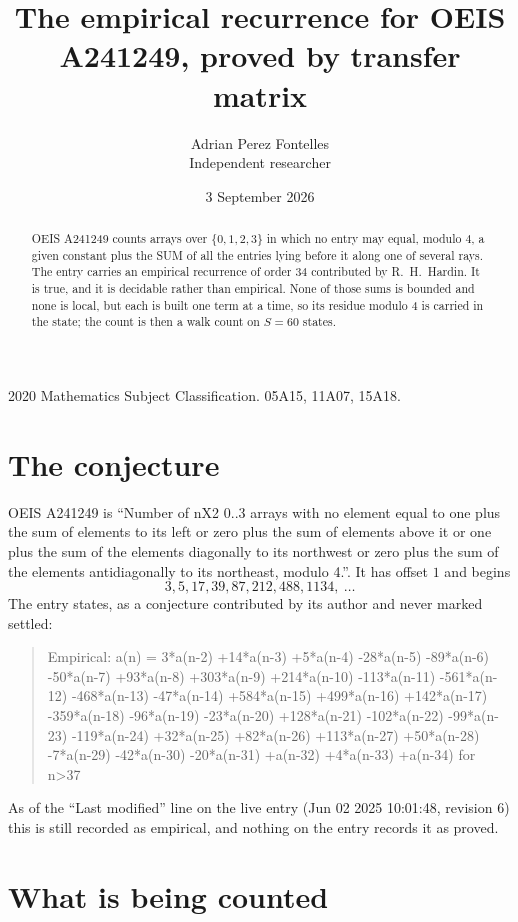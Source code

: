 \documentclass[11pt,a4paper]{article}
\title{The empirical recurrence for OEIS A241249, proved by transfer matrix}
\author{Adrian Perez Fontelles\\ \small Independent researcher}
\date{3 September 2026}
\theoremstyle{plain}
\theoremstyle{definition}
\begin{document}
\maketitle

\begin{abstract}
OEIS A241249 counts arrays over $\{0,1,2,3\}$ in which no entry may equal, modulo $4$, a given
constant plus the SUM of all the entries lying before it along one of several rays. The entry
carries an empirical recurrence of order $34$ contributed by R.~H.~Hardin. It is true, and
it is decidable rather than empirical. None of those sums is bounded and none is local, but
each is built one term at a time, so its residue modulo $4$ is carried in the state; the
count is then a walk count on $S=60$ states.
\end{abstract}

\noindent\small 2020 Mathematics Subject Classification. 05A15, 11A07, 15A18.\normalsize

\section{The conjecture}

OEIS A241249 is ``Number of nX2 0..3 arrays with no element equal to one plus the sum of elements to its left or zero plus the sum of elements above it or one plus the sum of the elements diagonally to its northwest or zero plus the sum of the elements antidiagonally to its northeast, modulo 4.''. It has offset $1$ and begins
\[
3, 5, 17, 39, 87, 212, 488, 1134,\ \dots
\]
The entry states, as a conjecture contributed by its author and never marked settled:
\begin{quote}
Empirical: a(n) = 3*a(n-2) +14*a(n-3) +5*a(n-4) -28*a(n-5) -89*a(n-6) -50*a(n-7) +93*a(n-8) +303*a(n-9) +214*a(n-10) -113*a(n-11) -561*a(n-12) -468*a(n-13) -47*a(n-14) +584*a(n-15) +499*a(n-16) +142*a(n-17) -359*a(n-18) -96*a(n-19) -23*a(n-20) +128*a(n-21) -102*a(n-22) -99*a(n-23) -119*a(n-24) +32*a(n-25) +82*a(n-26) +113*a(n-27) +50*a(n-28) -7*a(n-29) -42*a(n-30) -20*a(n-31) +a(n-32) +4*a(n-33) +a(n-34) for n>37
\end{quote}
As of the ``Last modified'' line on the live entry (Jun 02 2025 10:01:48, revision 6) this is still
recorded as empirical, and nothing on the entry records it as proved.

\section{What is being counted}
\end{document}
